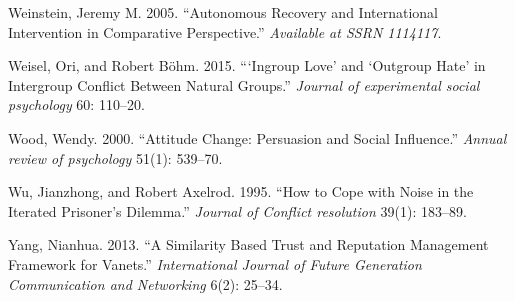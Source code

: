 \documentclass[11pt]{article}
\begin{document}
\leavevmode\hypertarget{ref-weinstein2005autonomous}{}%
Weinstein, Jeremy M. 2005. ``Autonomous Recovery and International
Intervention in Comparative Perspective.'' \emph{Available at SSRN
1114117}.

\leavevmode\hypertarget{ref-weisel2015ingroup}{}%
Weisel, Ori, and Robert Böhm. 2015. ```Ingroup Love' and `Outgroup Hate'
in Intergroup Conflict Between Natural Groups.'' \emph{Journal of
experimental social psychology} 60: 110--20.

\leavevmode\hypertarget{ref-wood2000attitude}{}%
Wood, Wendy. 2000. ``Attitude Change: Persuasion and Social Influence.''
\emph{Annual review of psychology} 51(1): 539--70.

\leavevmode\hypertarget{ref-wu1995cope}{}%
Wu, Jianzhong, and Robert Axelrod. 1995. ``How to Cope with Noise in the
Iterated Prisoner's Dilemma.'' \emph{Journal of Conflict resolution}
39(1): 183--89.

\leavevmode\hypertarget{ref-yang2013similarity}{}%
Yang, Nianhua. 2013. ``A Similarity Based Trust and Reputation
Management Framework for Vanets.'' \emph{International Journal of Future
Generation Communication and Networking} 6(2): 25--34.
\end{document}
